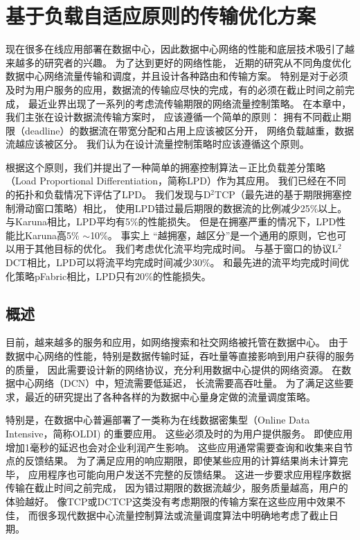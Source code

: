 \chapter{基于负载自适应原则的传输优化方案}
\label{chapter:LPD}
现在很多在线应用部署在数据中心，因此数据中心网络的性能和底层技术吸引了越来越多的研究者的兴趣。
为了达到更好的网络性能，
近期的研究从不同角度优化数据中心网络流量传输和调度，并且设计各种路由和传输方案。
特别是对于必须及时为用户服务的应用，数据流的传输应尽快的完成，有的必须在截止时间之前完成，
最近业界出现了一系列的考虑流传输期限的网络流量控制策略。
在本章中，我们主张在设计数据流传输方案时，
应该遵循一个简单的原则：
拥有不同截止期限（deadline）的数据流在带宽分配和占用上应该被区分开，
网络负载越重，数据流越应该被区分。
我们认为在设计流量控制策略时应该遵循这个原则。

根据这个原则，我们并提出了一种简单的拥塞控制算法－正比负载差分策略
（Load Proportional Differentiation，简称LPD）作为其应用。
我们已经在不同的拓扑和负载情况下评估了LPD。
我们发现与D$^2$TCP（最先进的基于期限拥塞控制滑动窗口策略）相比，
使用LPD错过最后期限的数据流的比例减少25$\%$以上。
与Karuna相比，LPD平均有5$\%$的性能损失。
但是在拥塞严重的情况下，LPD性能比Karuna高5$\%$ $\sim$10$\%$。
事实上 “越拥塞，越区分”是一个通用的原则，它也可以用于其他目标的优化。
我们考虑优化流平均完成时间。
与基于窗口的协议L$^2$DCT相比，LPD可以将流平均完成时间减少30$\%$。
和最先进的流平均完成时间优化策略pFabric相比，LPD只有20$\%$的性能损失。 


\section{概述}
\label{sec_LPD:Introduction}
目前，越来越多的服务和应用，如网络搜索和社交网络被托管在数据中心\cite{chowdhury2014efficient,chen2016scheduling,zhang2016fdrc,chowdhury2012coflow,chowdhury2015efficient}。
由于数据中心网络的性能，特别是数据传输时延，吞吐量等直接影响到用户获得的服务的质量，
因此需要设计新的网络协议，充分利用数据中心提供的网络资源。
在数据中心网络（DCN）中，短流需要低延迟，
长流需要高吞吐量\cite{DCTCP,chen2016scheduling}。
为了满足这些要求，最近的研究提出了各种各样的为数据中心量身定做的流量调度策略。


特别是，在数据中心普遍部署了一类称为在线数据密集型（Online Data Intensive，简称OLDI)\cite{OLDI,D2TCP} 的重要应用。
这些必须及时的为用户提供服务。
即使应用增加1毫秒的延迟也会对企业利润产生影响\cite{Latency}。
这些应用通常需要查询和收集来自节点的反馈结果。
为了满足应用的响应期限，即使某些应用的计算结果尚未计算完毕，
应用程序也可能向用户发送不完整的反馈结果。
这进一步要求应用程序数据传输在截止时间之前完成，
因为错过期限的数据流越少，服务质量越高，用户的体验越好。
像TCP或DCTCP这类没有考虑期限的传输方案在这些应用中效果不佳，
而很多现代数据中心流量控制算法\cite{D3, D2TCP}或流量调度算法\cite{PDQ}中明确地考虑了截止日期。


